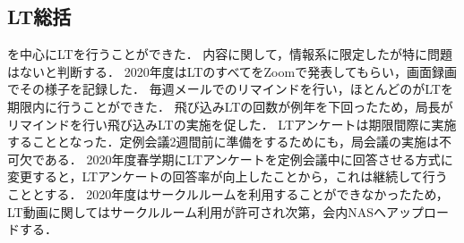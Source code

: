 \subsection*{LT総括}


\firstGrade{}を中心にLTを行うことができた．
内容に関して，情報系に限定したが特に問題はないと判断する．
2020年度はLTのすべてをZoomで発表してもらい，画面録画でその様子を記録した．
毎週メールでのリマインドを行い，ほとんどの\firstGrade{}がLTを期限内に行うことができた．
飛び込みLTの回数が例年を下回ったため，局長がリマインドを行い飛び込みLTの実施を促した．
LTアンケートは期限間際に実施することとなった．定例会議2週間前に準備をするためにも，局会議の実施は不可欠である．
2020年度春学期にLTアンケートを定例会議中に回答させる方式に変更すると，LTアンケートの回答率が向上したことから，これは継続して行うこととする．
2020年度はサークルルームを利用することができなかったため，LT動画に関してはサークルルーム利用が許可され次第，会内NASへアップロードする．
